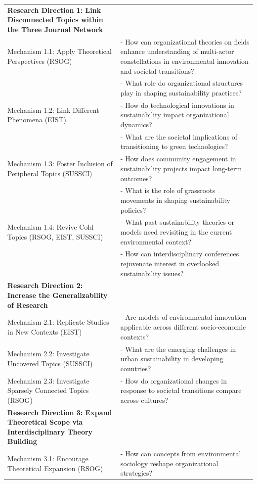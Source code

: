 \documentclass[12pt]{article}
\begin{document}
\begin{longtable}{|p{}|p{}|}
\hline \hline
\endlastfoot
\textbf{Research Direction 1: Link Disconnected Topics within the Three Journal Network} & \\
Mechanism 1.1: Apply Theoretical Perspectives (RSOG) & 
- How can organizational theories on fields enhance understanding of multi-actor constellations in environmental innovation and societal transitions? \\
& - What role do organizational structures play in shaping sustainability practices? \\
Mechanism 1.2: Link Different Phenomena (EIST) & 
- How do technological innovations in sustainability impact organizational dynamics? \\
& - What are the societal implications of transitioning to green technologies? \\
Mechanism 1.3: Foster Inclusion of Peripheral Topics (SUSSCI) & 
- How does community engagement in sustainability projects impact long-term outcomes? \\
& - What is the role of grassroots movements in shaping sustainability policies? \\
Mechanism 1.4: Revive Cold Topics (RSOG, EIST, SUSSCI) & 
- What past sustainability theories or models need revisiting in the current environmental context? \\
& - How can interdisciplinary conferences rejuvenate interest in overlooked sustainability issues? \\
\hline
\textbf{Research Direction 2: Increase the Generalizability of Research} & \\
Mechanism 2.1: Replicate Studies in New Contexts (EIST) & 
- Are models of environmental innovation applicable across different socio-economic contexts? \\
Mechanism 2.2: Investigate Uncovered Topics (SUSSCI) & 
- What are the emerging challenges in urban sustainability in developing countries? \\
Mechanism 2.3: Investigate Sparsely Connected Topics (RSOG) & 
- How do organizational changes in response to societal transitions compare across cultures? \\
\hline
\textbf{Research Direction 3: Expand Theoretical Scope via Interdisciplinary Theory Building} & \\
Mechanism 3.1: Encourage Theoretical Expansion (RSOG) & 
- How can concepts from environmental sociology reshape organizational strategies? \\

\end{longtable}
\end{document}
